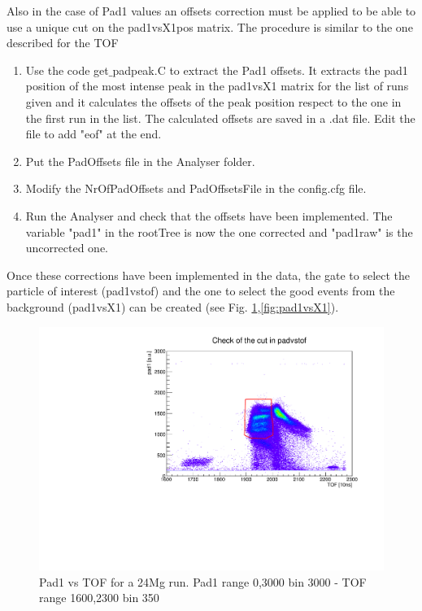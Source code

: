 \documentclass[]{report}
\begin{document}
Also in the case of Pad1 values an offsets correction must be applied to be able to use a unique cut on the pad1vsX1pos matrix.
The procedure is similar to the one described for the TOF
\begin{enumerate}
	\item Use the code get$\_$padpeak.C to extract the Pad1 offsets. It extracts the pad1 position of the most intense peak in the pad1vsX1 matrix for the list of runs given and it calculates the offsets of the peak position respect to the one in the first run in the list. The calculated offsets are saved in a .dat file. Edit the file to add "eof" at the end.
	\item Put the PadOffsets file in the Analyser folder.
	\item Modify the NrOfPadOffsets and PadOffsetsFile in the config.cfg file.
	\item Run the Analyser and check that the offsets have been implemented. The variable "pad1" in the rootTree is now the one corrected and "pad1raw" is the uncorrected one.
\end{enumerate}

Once these corrections have been implemented in the data, the gate to select the particle of interest (pad1vstof) and the one to select the good events from the background (pad1vsX1) can be created (see Fig. \ref{fig:pad1vstof},\ref{fig:pad1vsX1}).\\


\begin{figure}
	\includegraphics[width=\linewidth]{Figure/run2322-24Mg-pad1vstof.pdf}
	\caption{Pad1 vs TOF for a 24Mg run. Pad1 range 0,3000 bin 3000 - TOF range 1600,2300 bin 350}
	\label{fig:pad1vstof}
\end{figure}
\end{document}
